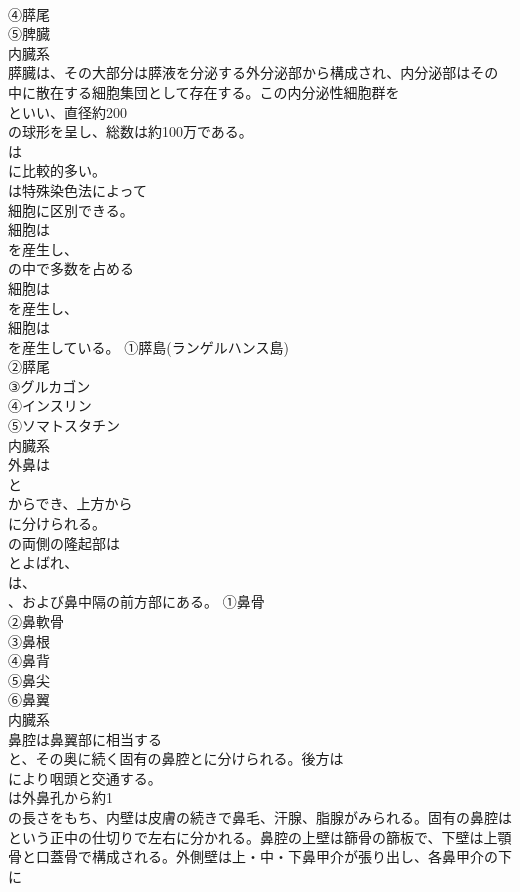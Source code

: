 \documentclass[8pt]{extreport}
\begin{document}
\begin{CJK}{UTF8}{min}
\\	④膵尾
\\	⑤脾臓
\\	内臓系
\\	膵臓は、その大部分は膵液を分泌する外分泌部から構成され、内分泌部はその中に散在する細胞集団として存在する。この内分泌性細胞群を
\\	といい、直径約200
\\	の球形を呈し、総数は約100万である。
\\	は
\\	に比較的多い。
\\	は特殊染色法によって
\\	細胞に区別できる。
\\	細胞は
\\	を産生し、
\\	の中で多数を占める
\\	細胞は
\\	を産生し、
\\	細胞は
\\	を産生している。	①膵島(ランゲルハンス島)
\\	②膵尾
\\	③グルカゴン
\\	④インスリン
\\	⑤ソマトスタチン
\\	内臓系
\\	外鼻は
\\	と
\\	からでき、上方から
\\	に分けられる。
\\	の両側の隆起部は
\\	とよばれ、
\\	は、
\\	、および鼻中隔の前方部にある。	①鼻骨
\\	②鼻軟骨
\\	③鼻根
\\	④鼻背
\\	⑤鼻尖
\\	⑥鼻翼
\\	内臓系
\\	鼻腔は鼻翼部に相当する
\\	と、その奥に続く固有の鼻腔とに分けられる。後方は
\\	により咽頭と交通する。
\\	は外鼻孔から約1
\\	の長さをもち、内壁は皮膚の続きで鼻毛、汗腺、脂腺がみられる。固有の鼻腔は
\\	という正中の仕切りで左右に分かれる。鼻腔の上壁は篩骨の篩板で、下壁は上顎骨と口蓋骨で構成される。外側壁は上・中・下鼻甲介が張り出し、各鼻甲介の下に

\end{CJK}
\end{document}
